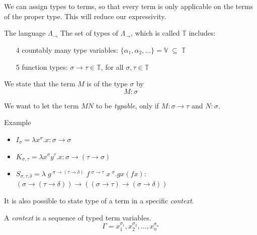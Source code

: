 \documentclass{beamer}
\begin{document}
\section{\secType}

\begin{frame}[t]{\subSTLC}
	We can assign types to terms, so that every term is only applicable on the terms of the proper type.
	\pause
	This will reduce our expressivity.
	\pause
	\begin{block}{The language $\Lambda_\to$}
		The set of types of $\Lambda_\to$, which is called $\mathbb{T}$ includes:
		\begin{enumerate}
			\item[4] countably many type variables: \quad $\{\alpha_1, \alpha_2, \dots\} = \mathbb{V} \;\subseteq\; \mathbb{T}$
			\pause
			\item[5] function types: \quad $\sigma \to \tau \in \mathbb{T}$, \quad for all $\sigma, \tau \in \mathbb{T}$
		\end{enumerate}
		\pause
		We state that the term $M$ is of the type $\sigma$ by
		\[M : \sigma\]
	\end{block}
	\pause
	We want to let the term \; $M N$ \; to be \emph{typable}, only if \; $M : \sigma \to \tau$ \; and \; $N : \sigma$.
\end{frame}

\begin{frame}{\subSTLC}
	\begin{exampleblock}{Example}
		\begin{itemize}
			\item $I_\sigma = \lambda x^\sigma . x : \sigma \to \sigma$
			\pause
			\item $K_{\sigma,\tau} = \lambda x^\sigma y^\tau. x : \sigma \to (\tau \to \sigma)$
			\pause
			\item $S_{\sigma,\tau,\delta} = \lambda \; g~^{\sigma \to (\tau \to \delta)} \; f~^{\sigma \to \tau} \; x~^\sigma. g x (f x) :$\\ \quad $(\sigma \to (\tau \to \delta)) \to ((\sigma \to \tau) \to (\sigma \to \delta))$
		\end{itemize}
	\end{exampleblock}
	\pause
	It is also possible to state type of a term in a specific \emph{context}.
	
	\pause
	A \emph{context} is a sequence of typed term variables.
	\[\Gamma = x_1^{\sigma_1}, x_2^{\sigma_2}, \dots, x_n^{\sigma_n}\]
\end{frame}
\end{document}
